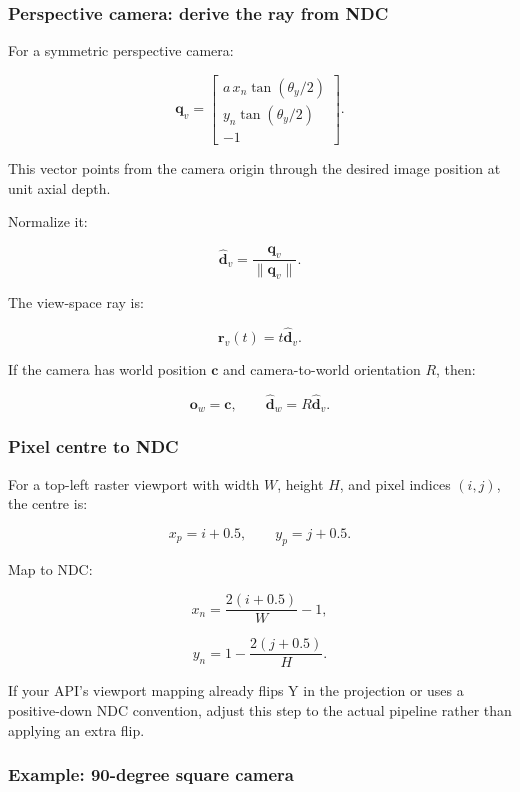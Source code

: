\subsubsection{Perspective camera: derive the ray from NDC}\label{perspective-camera-derive-the-ray-from-ndc}

For a symmetric perspective camera:

\[ \mathbf q_v= \begin{bmatrix} a\,x_n\tan(\theta_y/2)\\ y_n\tan(\theta_y/2)\\ -1 \end{bmatrix}. \]

This vector points from the camera origin through the desired image position at unit axial depth.

Normalize it:

\[ \boxed{ \hat{\mathbf d}_v= \frac{\mathbf q_v}{\|\mathbf q_v\|}. } \]

The view-space ray is:

\[ \boxed{ \mathbf r_v(t)=t\hat{\mathbf d}_v. } \]

If the camera has world position \(\mathbf c\) and camera-to-world orientation \(R\), then:

\[ \boxed{ \mathbf o_w=\mathbf c, \qquad \hat{\mathbf d}_w=R\hat{\mathbf d}_v. } \]

\subsubsection{Pixel centre to NDC}\label{pixel-centre-to-ndc}

For a top-left raster viewport with width \(W\), height \(H\), and pixel indices \((i,j)\), the centre is:

\[ x_p=i+0.5, \qquad y_p=j+0.5. \]

Map to NDC:

\[ \boxed{ x_n=\frac{2(i+0.5)}W-1, } \]

\[ \boxed{ y_n=1-\frac{2(j+0.5)}H. } \]

If your API's viewport mapping already flips Y in the projection or uses a positive-down NDC convention, adjust this step to the actual pipeline rather than applying an extra flip.

\subsubsection{Example: 90-degree square camera}\label{example-90-degree-square-camera}

